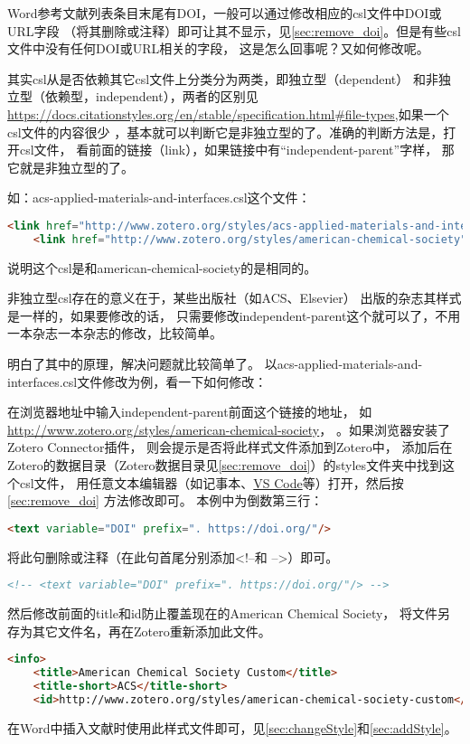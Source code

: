 \documentclass[theorem=false,mathfont=none,openany,sub3section]{easybook}
\begin{document}
{Word参考文献列表条目末尾有DOI，一般可以通过修改相应的csl文件中DOI或URL字段
（将其删除或注释）即可让其不显示，见\cref{sec:remove_doi}。但是有些csl文件中没有任何DOI或URL相关的字段，
这是怎么回事呢？又如何修改呢。

其实csl从是否依赖其它csl文件上分类分为两类，即独立型（dependent）
和非独立型（依赖型，independent），两者的区别见\url{https://docs.citationstyles.org/en/stable/specification.html#file-types},如果一个csl文件的内容很少
，基本就可以判断它是非独立型的了。准确的判断方法是，打开csl文件，
看前面的链接（link），如果链接中有“independent-parent”字样，
那它就是非独立型的了。

如：acs-applied-materials-and-interfaces.csl这个文件：
\begin{lstlisting}[language=HTML]
	<link href="http://www.zotero.org/styles/acs-applied-materials-and-interfaces" rel="self"/>
	<link href="http://www.zotero.org/styles/american-chemical-society" rel="independent-parent"/>
\end{lstlisting}	
说明这个csl是和american-chemical-society的是相同的。

非独立型csl存在的意义在于，某些出版社（如ACS、Elsevier）
出版的杂志其样式是一样的，如果要修改的话，
只需要修改independent-parent这个就可以了，不用一本杂志一本杂志的修改，比较简单。

明白了其中的原理，解决问题就比较简单了。
以acs-applied-materials-and-interfaces.csl文件修改为例，看一下如何修改：

在浏览器地址中输入independent-parent前面这个链接的地址，
如\url{http://www.zotero.org/styles/american-chemical-society}，
。如果浏览器安装了Zotero Connector插件，
则会提示是否将此样式文件添加到Zotero中，
添加后在Zotero的数据目录（Zotero数据目录见\cref{sec:remove_doi}）的styles文件夹中找到这个csl文件，
用任意文本编辑器（如记事本、\href{https://code.visualstudio.com/Download}{VS Code}等）打开，然后按\cref{sec:remove_doi} 方法修改即可。
本例中为倒数第三行：
\begin{lstlisting}[language=HTML]
	<text variable="DOI" prefix=". https://doi.org/"/>
\end{lstlisting}
将此句删除或注释（在此句首尾分别添加<!--和 -->）即可。
\begin{lstlisting}[language=HTML]
	<!-- <text variable="DOI" prefix=". https://doi.org/"/> -->
\end{lstlisting}
然后修改前面的title和id防止覆盖现在的American Chemical Society，
将文件另存为其它文件名，再在Zotero重新添加此文件。
\begin{lstlisting}[language=HTML]
	<info>
	<title>American Chemical Society Custom</title>
	<title-short>ACS</title-short>
	<id>http://www.zotero.org/styles/american-chemical-society-custom</id>
\end{lstlisting}
在Word中插入文献时使用此样式文件即可，见\cref{sec:changeStyle}和\cref{sec:addStyle}。


}
\end{document}
